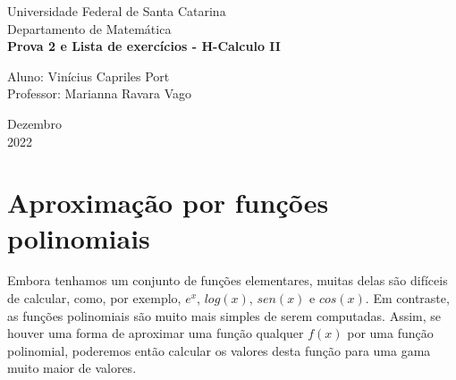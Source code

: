 \documentclass[a4paper, 12pt]{article}
\begin{document}

\begin{titlepage}
	\begin{center}


		\Huge{Universidade Federal de Santa Catarina}\\
		\large{Departamento de Matemática}\\
		\vspace{15pt}
		\vspace{95pt}
		\textbf{\LARGE{Prova 2 e Lista de exercícios - H-Calculo II }}\\
		\vspace{3,5cm}
	\end{center}

	\begin{flushleft}
		\begin{tabbing}
			Aluno:  Vinícius Capriles Port\\
			Professor: Marianna Ravara Vago\\
		\end{tabbing}
	\end{flushleft}
	\vspace{1cm}

	\begin{center}
		\vspace{\fill}
		Dezembro\\
		2022
	\end{center}
\end{titlepage}


\newpage
\tableofcontents
\thispagestyle{empty}

\newpage
{}
\section{Aproximação por funções polinomiais}

Embora tenhamos um conjunto de funções elementares, muitas delas são difíceis de calcular,
como, por exemplo, $e^x$, $log(x)$, $sen(x)$ e $cos(x)$. Em contraste,
as funções polinomiais são muito mais simples de serem computadas.
Assim, se houver uma forma de aproximar uma função qualquer $f(x)$ por uma função polinomial,
poderemos então calcular os valores desta função para uma gama muito maior de valores.
\end{document}

